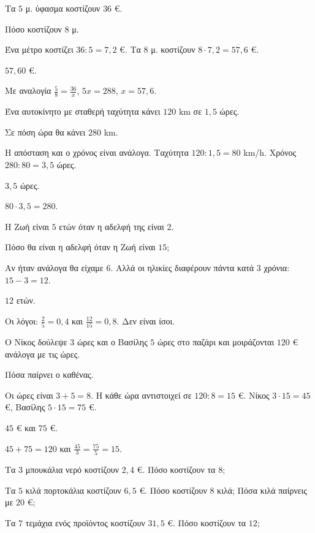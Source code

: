 \tixero Τα $5$ μ. ύφασμα κοστίζουν $36$ €.\par
\tithelo Πόσο κοστίζουν $8$ μ.\par
\possindeo Ένα μέτρο κοστίζει $36:5=7{,}2$ €. Τα $8$ μ. κοστίζουν $8\cdot7{,}2=57{,}6$ €.\par
\apantisi $57{,}60$ €.\par
\elegxos Με αναλογία $\frac{5}{8}=\frac{36}{x}$, $5x=288$, $x=57{,}6$.

\tixero Ένα αυτοκίνητο με σταθερή ταχύτητα κάνει $120$ km σε $1{,}5$ ώρες.\par
\tithelo Σε πόση ώρα θα κάνει $280$ km.\par
\possindeo Η απόσταση και ο χρόνος είναι ανάλογα. Ταχύτητα $120:1{,}5=80$ km/h. Χρόνος $280:80=3{,}5$ ώρες.\par
\apantisi $3{,}5$ ώρες.\par
\elegxos $80\cdot3{,}5=280$.

\tixero Η Ζωή είναι $5$ ετών όταν η αδελφή της είναι $2$.\par
\tithelo Πόσο θα είναι η αδελφή όταν η Ζωή είναι $15$;\par
\possindeo Αν ήταν ανάλογα θα είχαμε $6$. Αλλά οι ηλικίες διαφέρουν πάντα κατά $3$ χρόνια: $15-3=12$.\par
\apantisi $12$ ετών.\par
\elegxos Οι λόγοι: $\frac{2}{5}=0{,}4$ και $\frac{12}{15}=0{,}8$. Δεν είναι ίσοι.

\tixero Ο Νίκος δούλεψε $3$ ώρες και ο Βασίλης $5$ ώρες στο παζάρι και μοιράζονται $120$ € ανάλογα με τις ώρες.\par
\tithelo Πόσα παίρνει ο καθένας.\par
\possindeo Οι ώρες είναι $3+5=8$. Η κάθε ώρα αντιστοιχεί σε $120:8=15$ €. Νίκος $3\cdot15=45$ €, Βασίλης $5\cdot15=75$ €.\par
\apantisi $45$ € και $75$ €.\par
\elegxos $45+75=120$ και $\frac{45}{3}=\frac{75}{5}=15$.



\ex Τα $3$ μπουκάλια νερό κοστίζουν $2{,}4$ €. Πόσο κοστίζουν τα $8$;

\ex Τα $5$ κιλά πορτοκάλια κοστίζουν $6{,}5$ €. Πόσο κοστίζουν $8$ κιλά; Πόσα κιλά παίρνεις με $20$ €;

\ex Τα $7$ τεμάχια ενός προϊόντος κοστίζουν $31{,}5$ €. Πόσο κοστίζουν τα $12$;

